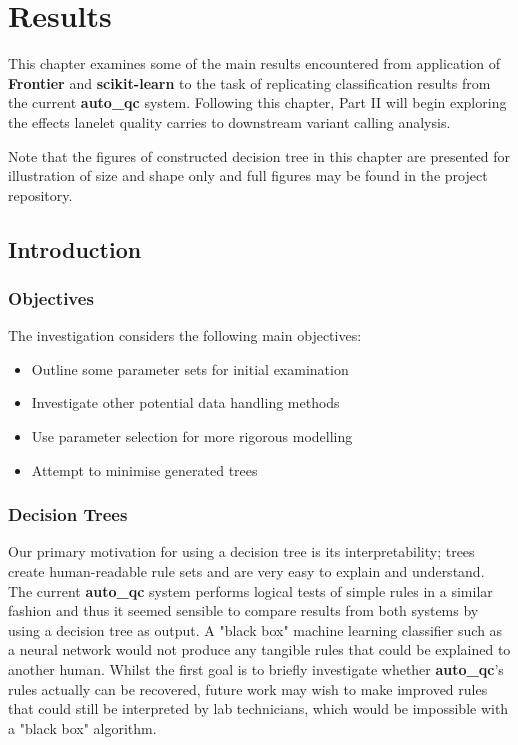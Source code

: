 \chapter{Results}
\ifpdf
    \graphicspath{{Chapter4/Figs/Raster/}{Chapter4/Figs/PDF/}{Chapter4/Figs/}}
\else
    \graphicspath{{Chapter4/Figs/Vector/}{Chapter4/Figs/}}
\fi

This chapter examines some of the main results encountered from application of
\textbf{Frontier} and \textbf{scikit-learn} to the task of replicating
classification results from the current \textbf{auto\_qc} system.
Following this chapter, Part II will begin exploring the effects lanelet quality
carries to downstream variant calling analysis.

Note that the figures of constructed decision tree in this chapter are presented
for illustration of size and shape only and full figures may be found in the
project repository\citep{github:frontier}.


\section{Introduction}
\subsection{Objectives}

The investigation considers the following main objectives:

\begin{itemize}
    \item Outline some parameter sets for initial examination
    \item Investigate other potential data handling methods
    \item Use parameter selection for more rigorous modelling
    \item Attempt to minimise generated trees
\end{itemize}

\subsection{Decision Trees}

Our primary motivation for using a decision tree is its interpretability; trees
create human-readable rule sets and are very easy to explain and understand. The
current \textbf{auto\_qc} system performs logical tests of simple rules in a
similar fashion and thus it seemed sensible to compare results from both systems
by using a decision tree as output. A "black box" machine learning
classifier such as a neural network would not produce any tangible rules that
could be explained to another human. Whilst the first goal is to briefly
investigate whether \textbf{auto\_qc}'s rules actually can be recovered, future work may
wish to make improved rules that could still be interpreted by lab technicians,
which would be impossible with a "black box" algorithm.

